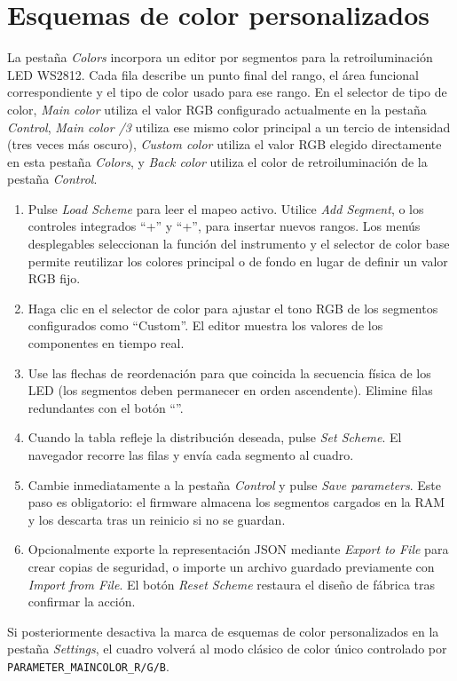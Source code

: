 \section{Esquemas de color personalizados}
La pestaña \emph{Colors} incorpora un editor por segmentos para la retroiluminación LED WS2812. Cada fila describe un punto final del rango, el área funcional correspondiente y el tipo de color usado para ese rango. En el selector de tipo de color, \emph{Main color} utiliza el valor RGB configurado actualmente en la pestaña \emph{Control}, \emph{Main color /3} utiliza ese mismo color principal a un tercio de intensidad (tres veces más oscuro), \emph{Custom color} utiliza el valor RGB elegido directamente en esta pestaña \emph{Colors}, y \emph{Back color} utiliza el color de retroiluminación de la pestaña \emph{Control}.

\begin{enumerate}
    \item Pulse \emph{Load Scheme} para leer el mapeo activo. Utilice \emph{Add Segment}, o los controles integrados ``+\textuparrow{}'' y ``+\textdownarrow{}'', para insertar nuevos rangos. Los menús desplegables seleccionan la función del instrumento y el selector de color base permite reutilizar los colores principal o de fondo en lugar de definir un valor RGB fijo.
    \item Haga clic en el selector de color para ajustar el tono RGB de los segmentos configurados como ``Custom''. El editor muestra los valores de los componentes en tiempo real.
    \item Use las flechas de reordenación para que coincida la secuencia física de los LED (los segmentos deben permanecer en orden ascendente). Elimine filas redundantes con el botón ``\texttimes{}''.
    \item Cuando la tabla refleje la distribución deseada, pulse \emph{Set Scheme}. El navegador recorre las filas y envía cada segmento al cuadro.
    \item Cambie inmediatamente a la pestaña \emph{Control} y pulse \emph{Save parameters}. Este paso es obligatorio: el firmware almacena los segmentos cargados en la RAM y los descarta tras un reinicio si no se guardan.
    \item Opcionalmente exporte la representación JSON mediante \emph{Export to File} para crear copias de seguridad, o importe un archivo guardado previamente con \emph{Import from File}. El botón \emph{Reset Scheme} restaura el diseño de fábrica tras confirmar la acción.
\end{enumerate}

Si posteriormente desactiva la marca de esquemas de color personalizados en la pestaña \emph{Settings}, el cuadro volverá al modo clásico de color único controlado por \verb|PARAMETER_MAINCOLOR_R/G/B|.
